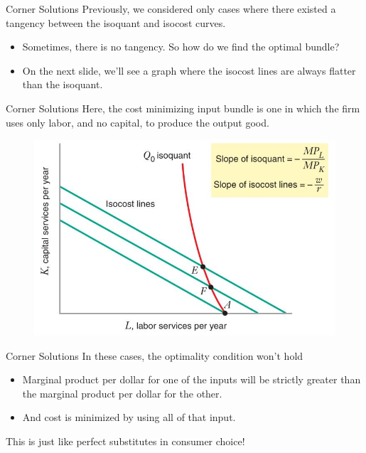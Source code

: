 \documentclass[11pt,t]{beamer}
\begin{document}
\begin{frame}{Corner Solutions}
  Previously, we considered only cases where there existed a tangency between the isoquant and isocost curves.


  \begin{itemize}
   \item  Sometimes, there is no tangency. So how do we find the optimal bundle?
  
    \item On the next slide, we'll see a graph where the isocost lines are always flatter than the isoquant.
  \end{itemize}
\end{frame}


\begin{frame}{Corner Solutions}
  Here, the cost minimizing input bundle is one in which the firm  uses only labor, and no capital, to produce the output good.
  \begin{figure}
    \includegraphics[width=0.7\linewidth]{figures/fig7_3.jpg}
  \end{figure}
\end{frame}

\begin{frame}{Corner Solutions}
  In these cases, the optimality condition won't hold

  \begin{itemize}
    \item Marginal product per dollar for one of the inputs will be strictly greater than the marginal product per dollar for the other.
    
    \item And cost is minimized by using all of that input.
  \end{itemize}

  \pause\bigskip 
  This is just like perfect substitutes in consumer choice!
\end{frame}
\end{document}
